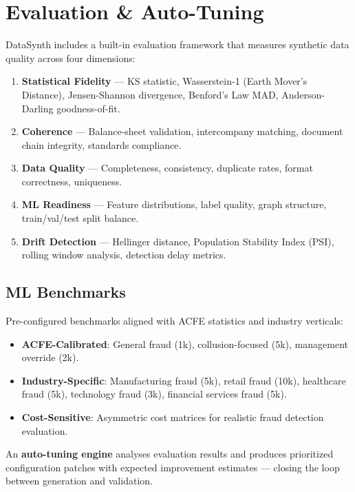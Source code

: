 \documentclass[11pt,a4paper]{article}
\begin{document}
\section{Evaluation \& Auto-Tuning}

DataSynth includes a built-in evaluation framework that measures synthetic
data quality across four dimensions:

\begin{enumerate}[leftmargin=1.4em, itemsep=3pt]
  \item \textbf{Statistical Fidelity} --- KS statistic, Wasserstein-1 (Earth
        Mover's Distance), Jensen-Shannon divergence, Benford's Law MAD,
        Anderson-Darling goodness-of-fit.
  \item \textbf{Coherence} --- Balance-sheet validation, intercompany matching,
        document chain integrity, standards compliance.
  \item \textbf{Data Quality} --- Completeness, consistency, duplicate rates,
        format correctness, uniqueness.
  \item \textbf{ML Readiness} --- Feature distributions, label quality, graph
        structure, train/val/test split balance.
  \item \textbf{Drift Detection} --- Hellinger distance, Population Stability Index (PSI),
        rolling window analysis, detection delay metrics.
\end{enumerate}

\subsection{ML Benchmarks}

Pre-configured benchmarks aligned with ACFE statistics and industry verticals:

\begin{itemize}[leftmargin=1.4em, itemsep=2pt]
  \item \textbf{ACFE-Calibrated}: General fraud (1k), collusion-focused (5k), management override (2k).
  \item \textbf{Industry-Specific}: Manufacturing fraud (5k), retail fraud (10k), healthcare fraud (5k), technology fraud (3k), financial services fraud (5k).
  \item \textbf{Cost-Sensitive}: Asymmetric cost matrices for realistic fraud detection evaluation.
\end{itemize}

\noindent
An \textbf{auto-tuning engine} analyses evaluation results and produces
prioritized configuration patches with expected improvement estimates ---
closing the loop between generation and validation.
\end{document}
